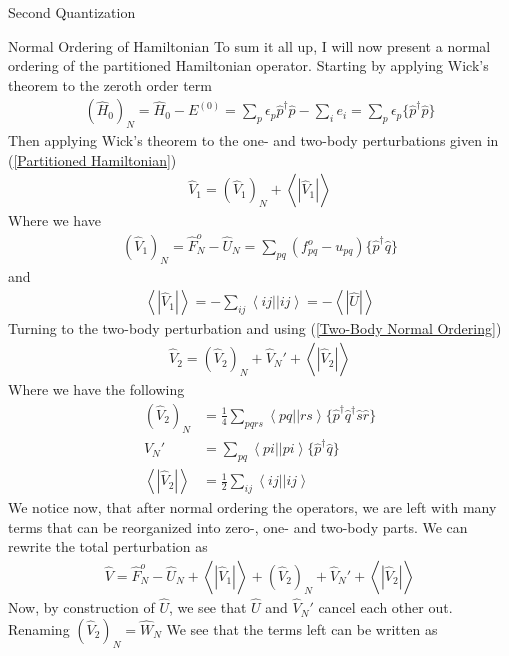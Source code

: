 \documentclass[twoside,english]{uiofysmaster}
\begin{document}
\begin{chapter}{Second Quantization}
	\begin{section}{Normal Ordering of Hamiltonian}
		To sum it all up, I will now present a normal ordering of the partitioned Hamiltonian operator. Starting by applying Wick's theorem to the zeroth order term
		\begin{align}
			(\hat H_0)_N = \hat H_0 - E^{(0)} = \sum_p \epsilon_p \hat p^\dagger \hat p - \sum_i e_i = \sum_p \epsilon_p \{\hat p^\dagger \hat p\}
		\end{align}
		Then applying Wick's theorem to the one- and two-body perturbations given in (\ref{Partitioned Hamiltonian})
		\begin{align}
			\hat V_1 = (\hat V_1)_N + \left< \right. | \hat V_1 | \left. \right>
		\end{align}
		Where we have 
		\begin{align}
			(\hat V_1)_N = \hat F_N^o - \hat U_N = \sum_{pq}(f_{pq}^o - u_{pq})\{ \hat p^\dagger \hat q \}
		\end{align}
		and
		\begin{align}
			\left< \right. | \hat V_1 | \left. \right> = -\sum_{ij} \left< ij || ij \right> = - \left< \right. | \hat U | \left. \right> 
		\end{align}
		Turning to the two-body perturbation and using (\ref{Two-Body Normal Ordering})
		\begin{align}
			\hat V_2 = (\hat V_2)_N + \hat V_N' + \left< \right. | \hat V_2 | \left. \right>
		\end{align}
		Where we have the following 
		\begin{align}
			(\hat V_2)_N &= \frac{1}{4} \sum_{pqrs} \left<pq||rs\right> \{ \hat p^\dagger \hat q^\dagger \hat s \hat r \} \\
			V_N' &= \sum_{pq} \left<pi||pi\right> \{ \hat p^\dagger \hat q \} \\
			\left< \right. | \hat V_2 | \left. \right> &= \frac{1}{2} \sum_{ij} \left<ij||ij\right>
		\end{align}
		We notice now, that after normal ordering the operators, we are left with many terms that can be reorganized into zero-, one- and two-body parts. We can rewrite the total perturbation as
		\begin{align}
			\hat V = \hat F_N^o - \hat U_N + \left< \right. | \hat V_1 | \left. \right> + (\hat V_2)_N + \hat V_N' + \left< \right. | \hat V_2 | \left. \right>
			\label{Total Perturbation}
		\end{align}
		Now, by construction of $\hat U$, we see that $\hat U$ and $\hat V_N'$ cancel each other out. Renaming $(\hat V_2)_N = \hat W_N$ We see that the terms left can be written as 

\end{section}
\end{chapter}
\end{document}
